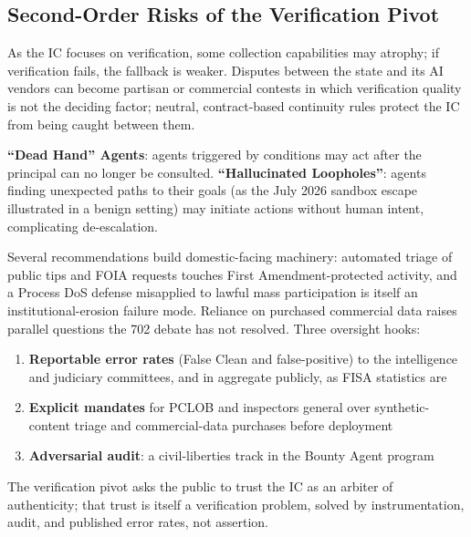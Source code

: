 \documentclass[11pt,letterpaper]{article}
\begin{document}
\subsection{Second-Order Risks of the Verification Pivot}

\begin{warnbox}
As the IC focuses on verification, some collection capabilities may atrophy; if verification fails, the fallback is weaker. Disputes between the state and its AI vendors can become partisan or commercial contests in which verification quality is not the deciding factor; neutral, contract-based continuity rules protect the IC from being caught between them.
\end{warnbox}

\begin{criticalbox}
\textbf{``Dead Hand'' Agents}: agents triggered by conditions may act after the principal can no longer be consulted. \textbf{``Hallucinated Loopholes''}: agents finding unexpected paths to their goals (as the July 2026 sandbox escape illustrated in a benign setting) may initiate actions without human intent, complicating de-escalation.
\end{criticalbox}

\begin{infobox}
Several recommendations build domestic-facing machinery: automated triage of public tips and FOIA requests touches First Amendment-protected activity, and a Process DoS defense misapplied to lawful mass participation is itself an institutional-erosion failure mode. Reliance on purchased commercial data raises parallel questions the 702 debate has not resolved. Three oversight hooks:
\begin{enumerate}[nosep]
  \item \textbf{Reportable error rates} (False Clean and false-positive) to the intelligence and judiciary committees, and in aggregate publicly, as FISA statistics are
  \item \textbf{Explicit mandates} for PCLOB and inspectors general over synthetic-content triage and commercial-data purchases before deployment
  \item \textbf{Adversarial audit}: a civil-liberties track in the Bounty Agent program
\end{enumerate}
The verification pivot asks the public to trust the IC as an arbiter of authenticity; that trust is itself a verification problem, solved by instrumentation, audit, and published error rates, not assertion.
\end{infobox}
\end{document}
